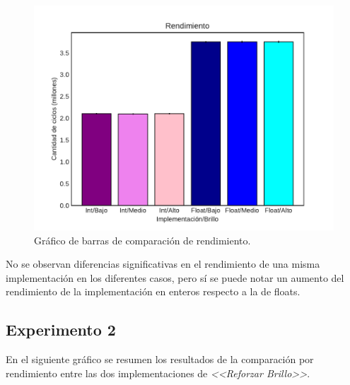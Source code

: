 \documentclass[a4paper]{article}
\begin{document}
\begin{figure}[h]
		\centering
		\includegraphics[scale=0.66]{img/IntvsFloat.pdf}
		\caption{Gráfico de barras de comparación de rendimiento.}		
\end{figure}
\justify
No se observan diferencias significativas en el rendimiento de una misma implementación en los diferentes casos, pero sí se puede notar un aumento del rendimiento de la implementación en enteros respecto a la de floats. 

\subsection{Experimento 2}
\justify
En el siguiente gráfico se resumen los resultados de la comparación por rendimiento entre las dos implementaciones de \textit{<<Reforzar Brillo>>}.
\end{document}
